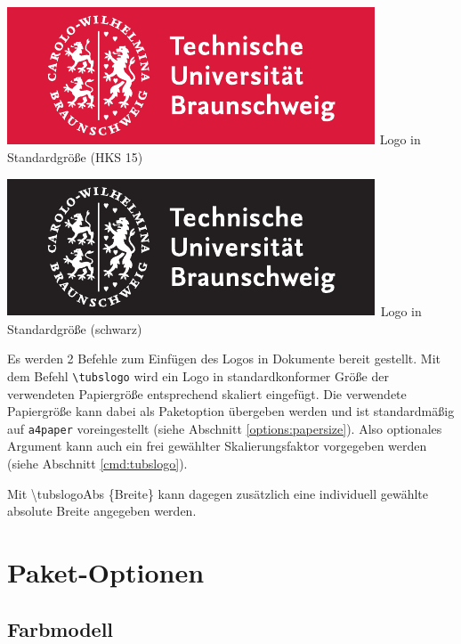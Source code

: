 \documentclass{scrartcl}
\begin{document}
\begin{minipage}{0.5\textwidth}
  \centering
  \includegraphics[width=\tubslogoBaseWidth]{TUBraunschweig_SC}
  {\sffamily Logo in Standardgröße (HKS 15)}
\end{minipage}
\begin{minipage}{0.5\textwidth}
  \centering
  \includegraphics[width=\tubslogoBaseWidth]{TUBraunschweig_B}
  {\sffamily Logo in Standardgröße (schwarz)}
\end{minipage}

Es werden 2 Befehle zum Einfügen des Logos in Dokumente bereit gestellt.
Mit dem Befehl {\color{tuRed}\lstinline{\tubslogo}} wird ein Logo in
standardkonformer Größe der verwendeten Papiergröße entsprechend skaliert
eingefügt. Die verwendete Papiergröße kann dabei als Paketoption übergeben
werden und ist standardmäßig auf \lstinline{a4paper} voreingestellt
(siehe Abschnitt \ref{options:papersize}).
Also optionales Argument kann auch ein frei gewählter Skalierungsfaktor
vorgegeben werden (siehe Abschnitt \ref{cmd:tubslogo}).

Mit {\color{tuRed}\ttfamily \textbackslash tubslogoAbs%
    \{\textcolor{tuGreenDark}{Breite}\}}
kann dagegen zusätzlich eine individuell gewählte absolute Breite
angegeben werden.


\section{Paket-Optionen}

\subsection{Farbmodell}\label{options:color}
\end{document}
